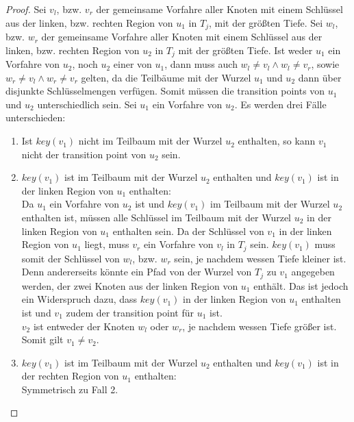 \documentclass[a4paper,12pt]{article}
\begin{document}
\begin{proof}
	Sei $v_l$, bzw. $v_r$ der gemeinsame Vorfahre aller Knoten mit einem Schlüssel aus der linken, bzw. rechten Region von $u_1$ in $T_j$, mit der größten Tiefe.  Sei $w_l$, bzw. $w_r$ der gemeinsame Vorfahre aller Knoten mit einem Schlüssel aus der linken, bzw. rechten Region von $u_2$ in $T_j$ mit der größten Tiefe. Ist weder $u_1$ ein Vorfahre von $u_2$, noch $u_2$ einer von $u_1$, dann muss auch $w_l \ne v_l \land w_l \ne v_r$, sowie $w_r \ne v_l \land w_r \ne v_r$ gelten, da die Teilbäume mit der Wurzel $u_1$ und $u_2$ dann über disjunkte Schlüsselmengen verfügen. Somit müssen die transition points von $u_1$ und $u_2$ unterschiedlich sein. Sei $u_1$ ein Vorfahre von $u_2$. Es werden drei Fälle unterschieden:
	\begin{enumerate}
		\item Ist $\mathit{key}\left(v_1\right)$ nicht im Teilbaum mit der Wurzel $u_2$ enthalten, so kann $v_1$ nicht der transition point von $u_2$ sein.
		\item $\mathit{key}\left(v_1\right)$ ist im Teilbaum mit der Wurzel $u_2$ enthalten und $\mathit{key}\left(v_1\right)$ ist  in der linken Region von $u_1$ enthalten:\\
		Da $u_1$ ein Vorfahre von $u_2$ ist und  $\mathit{key}\left(v_1\right)$ im Teilbaum mit der Wurzel $u_2$ enthalten ist, müssen alle Schlüssel im Teilbaum mit der Wurzel $u_2$ in der linken Region von $u_1$ enthalten sein. Da der Schlüssel von $v_1$ in der linken Region von $u_1$ liegt, muss $v_r$ ein Vorfahre von $v_l$ in $T_j$ sein. $\mathit{key}\left(v_1\right)$ muss somit der Schlüssel von $w_l$, bzw. $w_r$ sein, je nachdem wessen Tiefe kleiner ist. Denn andererseits könnte ein Pfad von der Wurzel von $T_j$ zu $v_1$ angegeben werden, der zwei Knoten aus der linken Region von $u_1$ enthält. Das ist jedoch ein Widerspruch dazu, dass  $\mathit{key}\left(v_1\right)$ in der linken Region von $u_1$ enthalten ist und $v_1$ zudem der transition point für $u_1$ ist.\\
		$v_2$ ist entweder der Knoten $w_l$ oder $w_r$, je nachdem wessen Tiefe größer ist. Somit gilt $v_1 \ne v_2$.
		\item $\mathit{key}\left(v_1\right)$ ist im Teilbaum mit der Wurzel $u_2$ enthalten und $\mathit{key}\left(v_1\right)$ ist in der rechten Region von $u_1$ enthalten:\\
		Symmetrisch zu Fall 2.
	\end{enumerate}
	
	
	
	
	
	
\end{proof}
\end{document}
